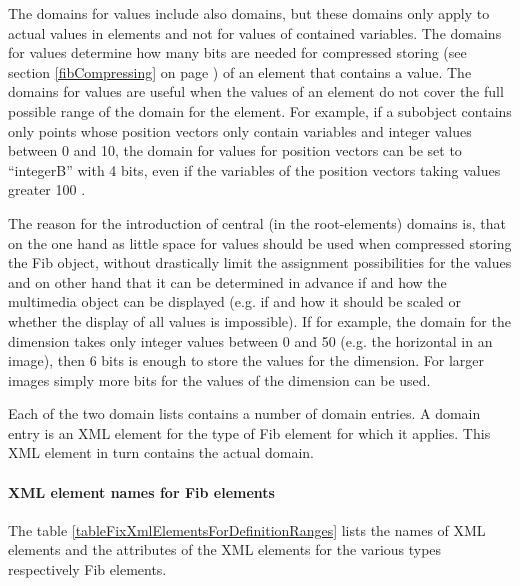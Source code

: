 The domains for values include also domains, but these domains only apply to actual values in elements and not for values of contained variables. The domains for values determine how many bits are needed for compressed storing (see section \ref{fibCompressing} on page \pageref{fibCompressing}) of an element that contains a value.
The domains for values are useful when the values of an element do not cover the full possible range of the domain for the element. For example, if a subobject contains only points whose position vectors only contain variables and integer values between 0 and 10, the domain for values for position vectors can be set to ``integerB'' with 4 bits, even if the variables of the position vectors taking values greater 100 .

The reason for the introduction of central (in the root-elements) domains is, that on the one hand as little space for values should be used when compressed storing the Fib object, without drastically limit the assignment possibilities for the values and on other hand that it can be determined in advance if and how the multimedia object can be displayed (e.g. if and how it should be scaled or whether the display of all values is impossible). If for example, the domain for the dimension takes only integer values between 0 and 50 (e.g. the horizontal in an image), then 6 bits is enough to store the values for the dimension. For larger images simply more bits for the values of the dimension can be used.

\bigskip\noindent
Each of the two domain lists contains a number of domain entries. A domain entry is an XML element for the type of Fib element for which it applies. This XML element in turn contains the actual domain.


\paragraph{XML element names for Fib elements}
\label{secXmlDefinitionrangesElements}

The table \ref{tableFixXmlElementsForDefinitionRanges} lists the names of XML elements and the attributes of the XML elements for the various types respectively Fib elements.


